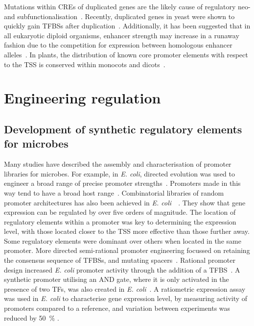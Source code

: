 \documentclass[../main.tex]{subfiles}
\begin{document}
Mutations within CREs of duplicated genes are the likely cause of
regulatory neo- and subfunctionalisation~\autocite{arsovskiEvolutionCisRegulatoryElements2015}.
Recently, duplicated genes in yeast were shown to quickly gain TFBSs after
duplication~\autocite{tsaiEvolutionCisregulatoryElements2012}.
Additionally, it has been suggested that in all eukaryotic diploid organisms, enhancer strength may increase in a runaway fashion due to the competition for expression between homologous enhancer alleles~\autocite{fyonEnhancerRunawayEvolution2015}.
In plants, the distribution of known core promoter elements with respect to the TSS is conserved within monocots and dicots~\autocite{kumariGenomeWideComputationalPrediction2013}.

\section{Engineering regulation}\label{engineering-regulation}
\subsection{Development of synthetic regulatory elements for
	microbes}\label{chapter1:development-of-synthetic-regulatory-elements-for-microbes}
Many studies have described the assembly and characterisation of promoter libraries for microbes.
For example, in \textit{E. coli}, directed evolution was used to engineer a broad range of precise promoter strengths~\autocite{alperTuningGeneticControl2005}.
Promoters made in this way tend to have a broad host range~\autocite{jensenSequenceSpacersConsensus1998}.
Combinatorial libraries of random promoter architectures has also been achieved in \textit{E. coli~}~\autocite{coxProgrammingGeneExpression2007}.
They show that gene expression can be regulated by over five orders of magnitude.
The location of regulatory elements within a promoter was key to determining the expression level, with those located closer to the TSS more effective than those further away.
Some regulatory elements were dominant over others when located in the same promoter.
More directed semi\hyp{}rational promoter engineering focussed on retaining the consensus sequence of TFBSs, and mutating spacers~\autocite{jensenSequenceSpacersConsensus1998}.
Rational promoter design increased \textit{E. coli} promoter activity through the addition of a TFBS~\autocite{zhangDesignDynamicSensorregulator2012}.
A synthetic promoter utilising an AND gate, where it is only activated in the presence of two TFs, was also created in \textit{E. coli}~\autocite{wangEngineeringModularOrthogonal2011}.
A ratiometric expression assay was used in \textit{E. coli} to characterise gene expression level, by measuring activity of promoters compared to a reference, and variation between experiments was reduced by \texttildelow\SI{50}{\percent} \autocite{kellyMeasuringActivityBioBrick2009}.
\end{document}

